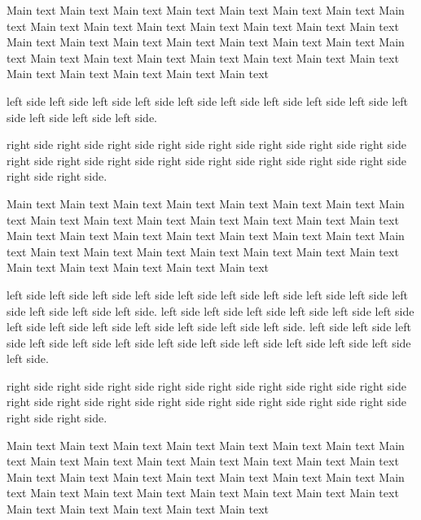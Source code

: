 \documentclass[a4paper]{book}
\begin{document}
\beginnumbering


\pstart%
      Main text Main text Main text Main text Main text Main text Main text Main text Main text Main text Main text Main text Main text Main text Main text Main text Main text Main text Main text Main text Main text Main text Main text Main text Main text Main text Main text Main text Main text Main text Main text Main text Main text Main text Main text
\pend
\pausenumbering*


\begin{pairs}
\begin{Leftside}
\resumenumbering*
    \pstart left side left side left side left side left side left side left side left side left side left side left side left side left side.\pend
\pausenumbering*
\end{Leftside}
\begin{Rightside}
\resumenumbering*
    \pstart right side right side right side right side right side right side right side right side right side right side right side right side right side right side right side right side right side right side.\pend
\pausenumbering*
\end{Rightside}
\end{pairs}
\Columns

\resumenumbering*



\pstart%
    Main text Main text Main text Main text Main text Main text Main text Main text Main text Main text Main text Main text Main text Main text Main text Main text Main text Main text Main text Main text Main text Main text Main text Main text Main text Main text Main text Main text Main text Main text Main text Main text Main text Main text Main text
\pend

\pausenumbering*

\begin{pairs}
\begin{Leftside}
\resumenumbering*
    \pstart left side left side left side left side left side left side left side left side left side left side left side left side left side. left side left side left side left side left side left side left side left side left side left side left side left side left side. left side left side left side left side left side left side left side left side left side left side left side left side left side.\pend
\pausenumbering*
\end{Leftside}
\begin{Rightside}
\resumenumbering*
    \pstart right side right side right side right side right side right side right side right side right side right side right side right side right side right side right side right side right side right side.\pend
\pausenumbering*
\end{Rightside}
\end{pairs}
\Columns

\pstart%
    Main text Main text Main text Main text Main text Main text Main text Main text Main text Main text Main text Main text Main text Main text Main text Main text Main text Main text Main text Main text Main text Main text Main text Main text Main text Main text Main text Main text Main text Main text Main text Main text Main text Main text Main text
\pend
\end{document}
